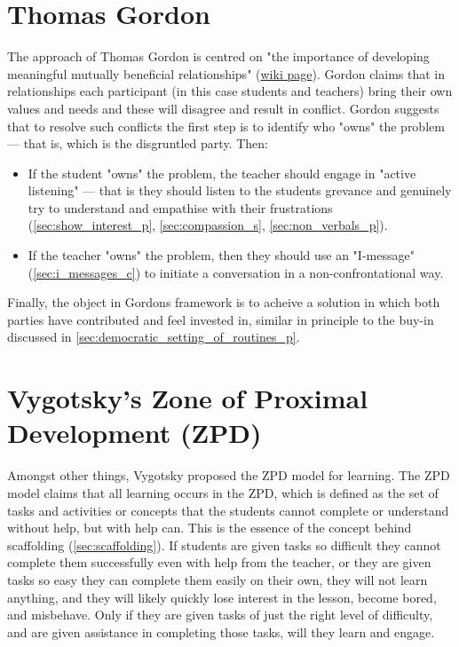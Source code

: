 \documentclass[12pt]{report}
\begin{document}
\section{Thomas Gordon}
\label{sec:gordon_theory}

The approach of Thomas Gordon is centred on "the importance of developing meaningful mutually beneficial relationships" (\href{https://en.wikibooks.org/wiki/Classroom_Management_Theorists_and_Theories/Thomas_Gordon}{wiki page}). Gordon claims that in relationships each participant (in this case students and teachers) bring their own values and needs and these will disagree and result in conflict. Gordon suggests that to resolve such conflicts the first step is to identify who "owns" the problem --- that is, which is the disgruntled party. Then:
\begin{itemize}
  \item If the student "owns" the problem, the teacher should engage in "active listening" --- that is they should listen to the students grevance and genuinely try to understand and empathise with their frustrations (\ref{sec:show_interest_p}, \ref{sec:compassion_s}, \ref{sec:non_verbals_p}).
  \item If the teacher "owns" the problem, then they should use an "I-message" (\ref{sec:i_messages_c}) to initiate a conversation in a non-confrontational way.
\end{itemize}
Finally, the object in Gordons framework is to acheive a solution in which both parties have contributed and feel invested in, similar in principle to the buy-in discussed in \ref{sec:democratic_setting_of_routines_p}.


\section{Vygotsky's Zone of Proximal Development (ZPD)}
\label{sec:zpd_theory}


Amongst other things, Vygotsky proposed the ZPD model for learning. The ZPD model claims that all learning occurs in the ZPD, which is defined as the set of tasks and activities or concepts that the students cannot complete or understand without help, but with help can. This is the essence of the concept behind scaffolding (\ref{sec:scaffolding}). If students are given tasks so difficult they cannot complete them successfully even with help from the teacher, or they are given tasks so easy they can complete them easily on their own, they will not learn anything, and they will likely quickly lose interest in the lesson, become bored, and misbehave. Only if they are given tasks of just the right level of difficulty, and are given assistance in completing those tasks, will they learn and engage.
\end{document}
